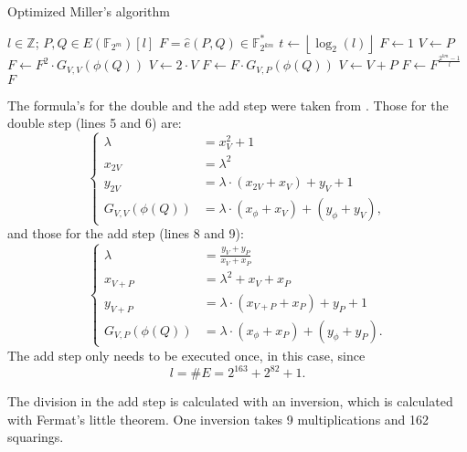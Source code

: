 \begin{algorithm}[h]
	\caption[Optimized Miller's algorithm]{Optimized Miller's algorithm \cite{barreto-efficient}}
	\label{algorithm-miller}
	\begin{algorithmic}[1]
		\REQUIRE $l \in \mathbb{Z}$; $P, Q \in E(\mathbb{F}_{2^m})[l]$
		\ENSURE $F = \hat{e}(P, Q) \in \mathbb{F}_{2^{km}}^*$
		\STATE $t \gets \left\lfloor \log _2 (l) \right\rfloor$
		\STATE $F \gets 1$
		\STATE $V \gets P$
			\STATE $F \gets F^2 \cdot G_{V,V}(\phi(Q))$
			\STATE $V \gets 2 \cdot V$
				\STATE $F \gets F \cdot G_{V,P}(\phi(Q))$
				\STATE $V \gets V + P$
			\ENDIF
		\ENDFOR
		\STATE $F \gets F^{\frac{2^{km} - 1 }{l}}$
		\RETURN $F$
	\end{algorithmic}
\end{algorithm}

The formula's for the double and the add step were taken from \cite{bertoni}. Those for the double step (lines 5 and 6) are:
\begin{displaymath}\begin{cases}
	\lambda &= x_V^2 + 1\\
	x_{2V} &= \lambda ^2\\
	y_{2V} &= \lambda \cdot (x_{2V} + x_V) + y_V + 1\\
	G_{V,V}(\phi(Q)) &= \lambda \cdot (x_{\phi} + x_V) + (y_{\phi} + y_V),
\end{cases}\end{displaymath}
and those for the add step (lines 8 and 9):
\begin{displaymath}\begin{cases}
	\lambda &= \frac{y_V + y_P}{x_V + x_P}\\
	x_{V + P} &= \lambda ^2 + x_V + x_P\\
	y_{V + P} &= \lambda \cdot (x_{V + P} + x_P) + y_P + 1\\
	G_{V,P}(\phi(Q)) &= \lambda \cdot (x_{\phi} + x_P) + (y_{\phi} + y_P).
\end{cases}\end{displaymath}
The add step only needs to be executed once, in this case, since
\begin{displaymath}l = \#E = 2^{163} + 2^{82} + 1.\end{displaymath}

The division in the add step is calculated with an inversion, which is calculated with Fermat's little theorem. One inversion takes 9 multiplications and 162 squarings.

